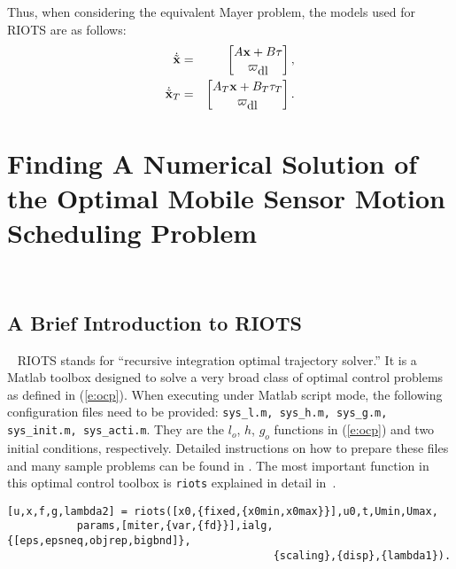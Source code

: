    Thus, when considering the equivalent Mayer problem, the models used for RIOTS are as follows:
\begin{eqnarray*}
  \dot{\tilde{\mathbf{x}}} &=&
    \begin{bmatrix}
    A \mathbf{x} + B \tau \\
    \varpi_{\hbox{dl}}
    \end{bmatrix}, \\
%
   \dot{\tilde{\mathbf{x}}}_T &=&
    \begin{bmatrix}
    A_T \mathbf{x} + B_T \tau_T \\
    \varpi_{\hbox{dl}}
    \end{bmatrix}.
\end{eqnarray*}




\section{Finding A Numerical Solution of the Optimal Mobile Sensor Motion Scheduling Problem}~\label{s:sol}
\subsection{A Brief Introduction to RIOTS}~\label{s:riots}
    RIOTS stands for ``recursive integration optimal trajectory solver.'' It is a Matlab toolbox designed to solve a very broad class of optimal control problems as defined in (\ref{e:ocp}). When executing under Matlab script mode,
the following configuration files need to be provided: {\tt sys\_l.m, sys\_h.m, sys\_g.m, sys\_init.m, sys\_acti.m}. They are the $l_o$, $h$, $g_o$ functions in (\ref{e:ocp}) and two initial conditions, respectively. Detailed instructions on how to prepare these files and many sample problems can be found in \cite{chenriots95}.     The most important function in this optimal control toolbox   is {\tt riots}  explained in detail in~\cite[p.73]{ChenRIOTS}.
    \begin{verbatim}
[u,x,f,g,lambda2] = riots([x0,{fixed,{x0min,x0max}}],u0,t,Umin,Umax,
           params,[miter,{var,{fd}}],ialg,{[eps,epsneq,objrep,bigbnd]},
                                          {scaling},{disp},{lambda1}).
    \end{verbatim}

